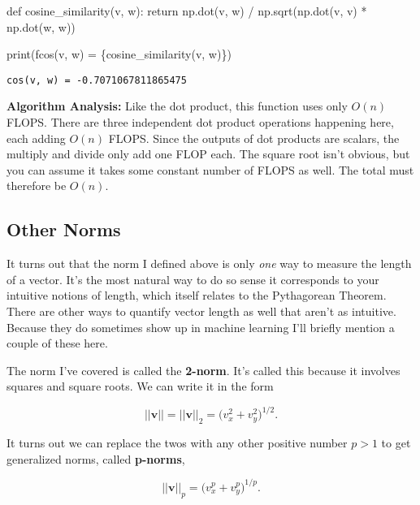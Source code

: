 \documentclass[
  letterpaper,
  DIV=11,
  numbers=noendperiod]{scrreprt}
\newenvironment{Shaded}{\begin{snugshade}}{\end{snugshade}}
\newcommand{\BuiltInTok}[1]{\textcolor[rgb]{0.00,0.23,0.31}{#1}}
\newcommand{\ControlFlowTok}[1]{\textcolor[rgb]{0.00,0.23,0.31}{#1}}
\newcommand{\KeywordTok}[1]{\textcolor[rgb]{0.00,0.23,0.31}{#1}}
\newcommand{\NormalTok}[1]{\textcolor[rgb]{0.00,0.23,0.31}{#1}}
\newcommand{\OperatorTok}[1]{\textcolor[rgb]{0.37,0.37,0.37}{#1}}
\newcommand{\SpecialCharTok}[1]{\textcolor[rgb]{0.37,0.37,0.37}{#1}}
\newcommand{\SpecialStringTok}[1]{\textcolor[rgb]{0.13,0.47,0.30}{#1}}
\begin{document}
\begin{Shaded}
\begin{Highlighting}[]
\KeywordTok{def}\NormalTok{ cosine\_similarity(v, w):}
    \ControlFlowTok{return}\NormalTok{ np.dot(v, w) }\OperatorTok{/}\NormalTok{ np.sqrt(np.dot(v, v) }\OperatorTok{*}\NormalTok{ np.dot(w, w))}

\BuiltInTok{print}\NormalTok{(}\SpecialStringTok{f\textquotesingle{}cos(v, w) = }\SpecialCharTok{\{}\NormalTok{cosine\_similarity(v, w)}\SpecialCharTok{\}}\SpecialStringTok{\textquotesingle{}}\NormalTok{)}
\end{Highlighting}
\end{Shaded}

\begin{verbatim}
cos(v, w) = -0.7071067811865475
\end{verbatim}

\textbf{Algorithm Analysis:} Like the dot product, this function uses
only \(O(n)\) FLOPS. There are three independent dot product operations
happening here, each adding \(O(n)\) FLOPS. Since the outputs of dot
products are scalars, the multiply and divide only add one FLOP each.
The square root isn't obvious, but you can assume it takes some constant
number of FLOPS as well. The total must therefore be \(O(n)\).

\hypertarget{other-norms}{%
\subsection{Other Norms}\label{other-norms}}

It turns out that the norm I defined above is only \emph{one} way to
measure the length of a vector. It's the most natural way to do so sense
it corresponds to your intuitive notions of length, which itself relates
to the Pythagorean Theorem. There are other ways to quantify vector
length as well that aren't as intuitive. Because they do sometimes show
up in machine learning I'll briefly mention a couple of these here.

The norm I've covered is called the \textbf{2-norm}. It's called this
because it involves squares and square roots. We can write it in the
form

\[||\mathbf{v}|| = ||\mathbf{v}||_2 = \big(v_x^2 + v_y^2 \big)^{1/2}.\]

It turns out we can replace the twos with any other positive number
\(p>1\) to get generalized norms, called \textbf{p-norms},

\[||\mathbf{v}||_p = \big(v_x^p + v_y^p \big)^{1/p}.\]
\end{document}

